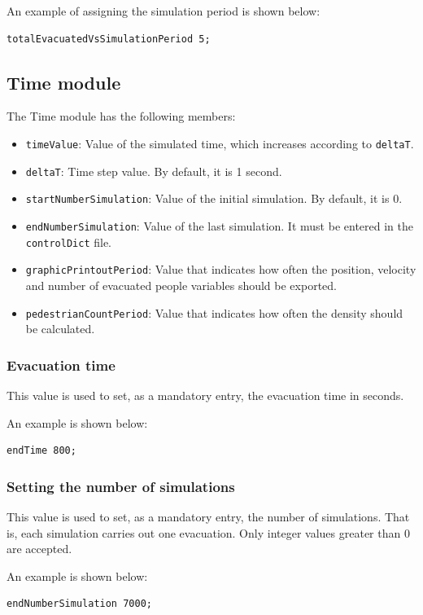 \documentclass[12pt,a4paper]{book}
\begin{document}
An example of assigning the simulation period is shown below:
\begin{lstlisting}[style=control]
  totalEvacuatedVsSimulationPeriod 5;
\end{lstlisting}

\subsection{Time module}
The Time module has the following members:
\begin{itemize}
  \item \texttt{timeValue}: Value of the simulated time, which increases according to
    \texttt{deltaT}.
  \item \texttt{deltaT}: Time step value. By default, it is 1 second.
  \item \texttt{startNumberSimulation}: Value of the initial simulation. By default, it is 0.
  \item \texttt{endNumberSimulation}: Value of the last simulation. It must be entered in the
    \texttt{controlDict} file.
  \item \texttt{graphicPrintoutPeriod}: Value that indicates how often the position, velocity and
    number of evacuated people variables should be exported.
  \item \texttt{pedestrianCountPeriod}: Value that indicates how often the density should be
    calculated.
\end{itemize}

\subsubsection*{Evacuation time}
This value is used to set, as a mandatory entry, the evacuation time in seconds.

An example is shown below:
\begin{lstlisting}[style=control]
endTime 800;
\end{lstlisting}

\subsubsection*{Setting the number of simulations}
This value is used to set, as a mandatory entry, the number of simulations. That is, each
simulation carries out one evacuation. Only integer values greater than 0 are accepted.

An example is shown below:
\begin{lstlisting}[style=control]
endNumberSimulation 7000;
\end{lstlisting}
\end{document}
